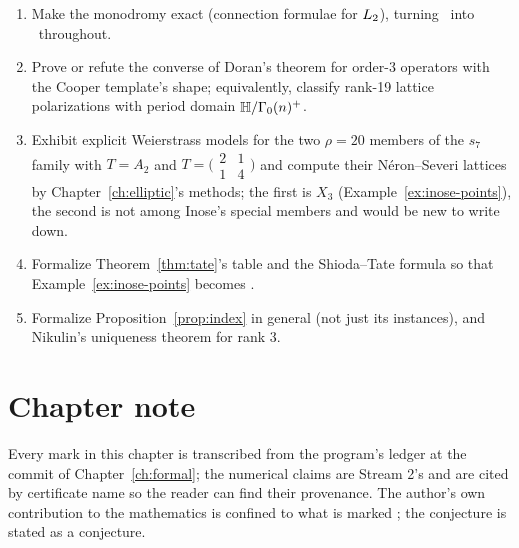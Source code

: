 \begin{enumerate}[leftmargin=2em]
\item Make the monodromy exact (connection formulae for $L_2$), turning
  \Nstatus\ into \Estatus\ throughout.
\item Prove or refute the converse of Doran's theorem for order-3 operators
  with the Cooper template's shape; equivalently, classify rank-19 lattice
  polarizations with period domain $\mathbb{H}/\Gamma_0(n)^+$.
\item Exhibit explicit Weierstrass models for the two $\rho=20$ members of the
  $s_7$ family with $T=A_2$ and $T=\bigl(\begin{smallmatrix}2&1\\1&4\end{smallmatrix}\bigr)$
  and compute their N\'eron--Severi lattices by Chapter~\ref{ch:elliptic}'s
  methods; the first is $X_3$ (Example~\ref{ex:inose-points}), the second is
  not among Inose's special members and would be new to write down.
\item Formalize Theorem~\ref{thm:tate}'s table and the Shioda--Tate formula so
  that Example~\ref{ex:inose-points} becomes \Kstatus.
\item Formalize Proposition~\ref{prop:index} in general (not just its
  instances), and Nikulin's uniqueness theorem for rank $3$.
\end{enumerate}

\section*{Chapter note}

Every mark in this chapter is transcribed from the program's ledger at the
commit of Chapter~\ref{ch:formal}; the numerical claims are Stream 2's and are
cited by certificate name so the reader can find their provenance. The
author's own contribution to the mathematics is confined to what is marked
\Kstatus; the conjecture is stated as a conjecture.
